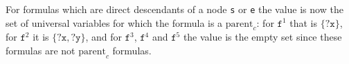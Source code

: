 For formulas which are direct descendants of a node \texttt{s} or \texttt{e} the value is now the set of universal variables for which the formula is a $\text{parent}_c$:
for $\texttt{f}^1$ that is $\{\texttt{?x}\}$, for $\texttt{f}^2$ it is $\{\texttt{?x}, \texttt{?y}\}$, and for $\texttt{f}^3$, $\texttt{f}^4$ and $\texttt{f}^5$ 
the value is the empty set since these formulas are not 
$\text{parent}_c$ formulas. 



